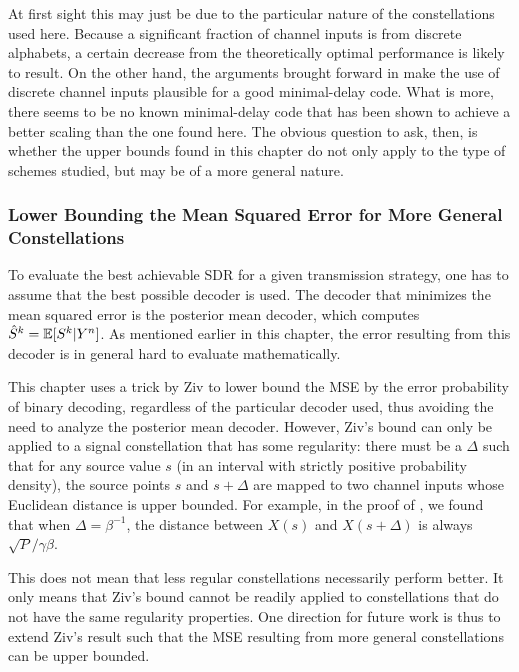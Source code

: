 At first sight this may just be due to the particular nature of the
constellations used here. Because a significant fraction of channel inputs is
from discrete alphabets, a certain decrease from the theoretically optimal
performance is likely to result. On the other hand, the arguments brought
forward in  make the use of discrete channel inputs
plausible for a good minimal-delay code. What is more, there seems to be no
known minimal-delay code that has been shown to achieve a better scaling than
the one found here. The obvious question to ask, then, is whether the upper
bounds found in this chapter do not only apply to the type of schemes studied,
but may be of a more general nature. 


\subsubsection{Lower Bounding the Mean Squared Error for More General
Constellations}

To evaluate the best achievable SDR for a given transmission strategy, one has
to assume that the best possible decoder is used. The decoder that minimizes the
mean squared error is the posterior mean decoder, which computes ${\hat{S}}^k = \mathbb{E}[S^k
| Y^n]$. As mentioned earlier in this chapter, the error resulting from this
decoder is in general hard to evaluate mathematically. 

This chapter uses a trick by Ziv to lower bound the MSE by the error probability
of binary decoding, regardless of the particular decoder used, thus avoiding the
need to analyze the posterior mean decoder. However, Ziv's bound can only be
applied to a signal constellation that has some regularity: there must be a
$\Delta$ such that for any source value $s$ (in an interval with strictly
positive probability density), the source points $s$ and $s + \Delta$ are mapped
to two channel inputs whose Euclidean distance is upper bounded. For example, in
the proof of , we found that when $\Delta  = \beta^{-1}$,
the distance between $X(s)$ and $X(s + \Delta)$ is always
$\sqrt{P}/\gamma\beta$. 

This does not mean that less regular constellations necessarily perform better.
It only means that Ziv's bound cannot be readily applied to constellations that
do not have the same regularity properties. One direction for future work is
thus to extend Ziv's result such that the MSE resulting from more general
constellations can be upper bounded. 


